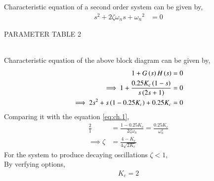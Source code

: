 \documentclass[journal,12pt,twocolumn]{IEEEtran}
\theoremstyle{remark}
\begin{document}
Characteristic equation of a second order system can be given by,
\begin{align}
    s^2 + 2\zeta \omega _n s + {\omega _n}^{2} &= 0 \label{eq:ch.1}
\end{align}
\begin{table}[ht]
    \centering
    
    \caption{PARAMETER TABLE 2}
    \label{tab:ch.45.2}
\end{table} \\
Characteristic equation of the above block diagram can be given by,
\begin{align}
    1+G\left(s\right)H\left(s\right) &= 0 \\
    \implies 1+\frac{0.25 K_c \left(1-s\right) }{s\left(2s+1\right)} &= 0 \\
    \implies 2s^2+s\left(1-0.25K_c\right)+0.25K_c&=0  
\end{align}
Comparing it with the equation \eqref{eq:ch.1},
\begin{align}
    \frac{2}{1} &= \frac{1-0.25K_c}{2\zeta\omega _n}=\frac{0.25K_c}{\omega _n^2}    \\
    \implies \zeta &= \frac{4-K_c}{4\sqrt{2K_c}} 
\end{align}
For the system to produce decaying oscillations {$\zeta<1$},    \\
By verfying options,
\begin{align}
    K_c=2
\end{align}
\end{document}
